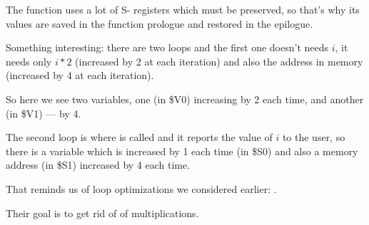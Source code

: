 ﻿

The function uses a lot of S- registers which must be preserved, so that's why its 
values are saved in the function prologue and restored in the epilogue.



Something interesting: there are two loops and the first one doesn't needs $i$, it needs only 
$i*2$ (increased by 2 at each iteration) and also the address in memory (increased by 4 at each iteration).

So here we see two variables, one (in \$V0) increasing by 2 each time, and another (in \$V1) --- by 4.

The second loop is where \printf is called and it reports the value of $i$ to the user, 
so there is a variable
which is increased by 1 each time (in \$S0) and also a memory address (in \$S1) increased by 4 each time.

That reminds us of loop optimizations we considered earlier: .

Their goal is to get rid of of multiplications.

